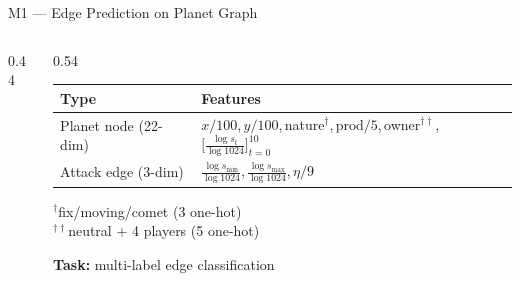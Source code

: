 \documentclass[10pt]{beamer}
\begin{document}
\begin{frame}{M1 — Edge Prediction on Planet Graph}
\begin{columns}[T]

\begin{column}{0.44\textwidth}
\centering
{}
\end{column}

\begin{column}{0.54\textwidth}
\footnotesize
\begin{tabular}{@{}p{1.7cm}p{3.5cm}@{}}
  \toprule
  Type & Features \\
  \midrule
  Planet node \newline (22-dim) &
    $x/100$,\,$y/100$,\,nature$^\dagger$,\,$\mathrm{prod}/5$,\,owner$^{\dagger\dagger}$,\,
    $\bigl[\tfrac{\log s_t}{\log 1024}\bigr]_{t=0}^{10}$ \\[6pt]
  Attack edge \newline (3-dim) &
    $\tfrac{\log s_{\min}}{\log 1024}$,\,$\tfrac{\log s_{\max}}{\log 1024}$,\,$\eta/9$ \\
  \bottomrule
\end{tabular}

\vspace{3pt}
{\tiny $^\dagger$fix/moving/comet (3 one-hot)\\
$^{\dagger\dagger}$neutral + 4 players (5 one-hot)}

\vspace{8pt}
\textbf{Task:} multi-label edge classification
\end{column}

\end{columns}
\end{frame}
\end{document}
